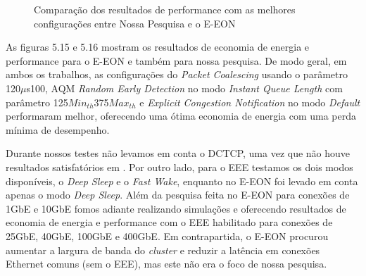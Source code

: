 \begin{figure}[!htb]
    \centering
    \label{fig:ComparaEEONPerformanceBestConfig}
    
    \hfill
    
    \caption{\centering Comparação dos resultados de performance com as melhores configurações entre Nossa Pesquisa e o E-EON}
\end{figure}

As figuras 5.15 e 5.16 mostram os resultados de economia de energia e performance para o E-EON e também para nossa pesquisa. De modo geral, em ambos os trabalhos, as configurações do \emph{Packet Coalescing} usando o parâmetro 120$\mu$s100, AQM \emph{Random Early Detection} no modo \emph{Instant Queue Length} com parâmetro 125{$\mathit{Min}_\mathit{th}$}375{$\mathit{Max}_\mathit{th}$} e \emph{Explicit Congestion Notification} no modo \emph{Default} performaram melhor, oferecendo uma ótima economia de energia com uma perda mínima de desempenho.

Durante nossos testes não levamos em conta o DCTCP, uma vez que não houve resultados satisfatórios em \cite{silva2018eon}. Por outro lado, para o EEE testamos os dois modos disponíveis, o \emph{Deep Sleep} e o \emph{Fast Wake}, enquanto no E-EON foi levado em conta apenas o modo \emph{Deep Sleep}. Além da pesquisa feita no E-EON para conexões de 1GbE e 10GbE fomos adiante realizando simulações e oferecendo resultados de economia de energia e performance com o EEE habilitado para conexões de 25GbE, 40GbE, 100GbE e 400GbE. Em contrapartida, o E-EON procurou aumentar a largura de banda do \emph{cluster} e reduzir a latência em conexões Ethernet comuns (sem o EEE), mas este não era o foco de nossa pesquisa.


